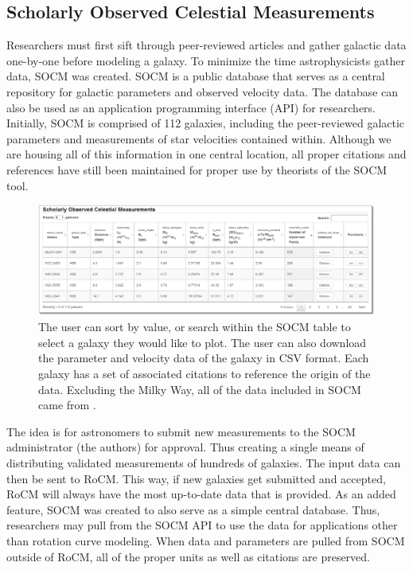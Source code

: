 \documentclass[conference]{IEEEtran-modified}
\begin{document}
\subsection{Scholarly Observed Celestial Measurements}
Researchers must first sift through peer-reviewed articles and gather galactic data one-by-one before modeling a galaxy. To minimize the time astrophysicists gather data, SOCM was created. SOCM is a public database that serves as a central repository for galactic parameters and observed velocity data. The database can also be used as an application programming interface (API) for researchers. Initially, SOCM is comprised of 112 galaxies, including the peer-reviewed galactic parameters and measurements of star velocities contained within.  Although we are housing all of this information in one central location, all proper citations and references have still been maintained for proper use by theorists of the SOCM tool.
       

\begin{figure}[!h]
\centering
\includegraphics[width=\textwidth]{socmtable}
\caption{The user can sort by value, or search within the SOCM table to select a galaxy they would like to plot. The user can also download the parameter and velocity data of the galaxy in CSV format. Each galaxy has a set of associated citations to reference the origin of the data. Excluding the Milky Way, all of the data included in SOCM came from \cite{mannheim}.}
\label{socm_fig}
\end{figure}


The idea is for astronomers to submit new measurements to the SOCM administrator (the authors) for approval. Thus creating a single means of distributing validated measurements of hundreds of galaxies. The input data can then be sent to RoCM. This way, if new galaxies get submitted and accepted, RoCM will always have the most up-to-date data that is provided. As an added feature, SOCM was created to also serve as a simple central database.  Thus, researchers may pull from the SOCM API to use the data for applications other than rotation curve modeling.  When data and parameters are pulled from SOCM outside of RoCM, all of the proper units as well as citations are preserved.
\end{document}
